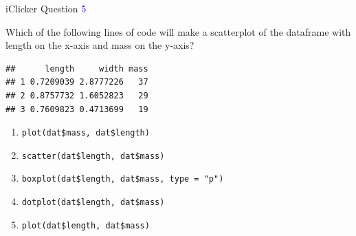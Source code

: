 \documentclass[ignorenonframetext,t]{beamer}
\begin{document}
\begin{frame}[fragile]{iClicker Question \textcolor{blue}{5}}

Which of the following lines of code will make a scatterplot of the
dataframe with length on the x-axis and mass on the y-axis?

\begin{verbatim}
##      length     width mass
## 1 0.7209039 2.8777226   37
## 2 0.8757732 1.6052823   29
## 3 0.7609823 0.4713699   19
\end{verbatim}

\begin{enumerate}[A]
\item \texttt{plot(dat\$mass, dat\$length)}
\item \texttt{scatter(dat\$length, dat\$mass)}
\item \texttt{boxplot(dat\$length, dat\$mass, type = "p")}
\item \texttt{dotplot(dat\$length, dat\$mass)}
\item \texttt{plot(dat\$length, dat\$mass)}
\end{enumerate}

\vfill


\end{frame}
\end{document}

